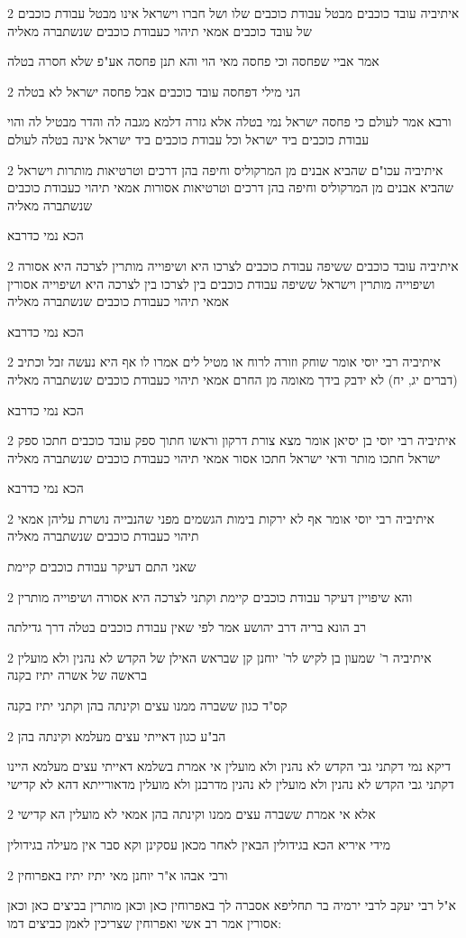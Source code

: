 \documentclass[12pt, openany]{book}
\newcommand{\sethebfont}{
\fontsize{10.5pt}{21.0pt} \selectfont
}
\newcommand{\twocol}[1]{
	{\sethebfont \begin{multicols}{2}
			#1
	\end{multicols}}	
}
\begin{document}
\twocol{איתיביה עובד כוכבים מבטל עבודת כוכבים שלו ושל חברו וישראל אינו מבטל עבודת כוכבים של עובד כוכבים אמאי תיהוי כעבודת כוכבים שנשתברה מאליה
\par אמר אביי שפחסה וכי פחסה מאי הוי והא תנן פחסה אע"פ שלא חסרה בטלה}
\twocol{הני מילי דפחסה עובד כוכבים אבל פחסה ישראל לא בטלה
\par ורבא אמר לעולם כי פחסה ישראל נמי בטלה אלא גזרה דלמא מגבה לה והדר מבטיל לה והוי עבודת כוכבים ביד ישראל וכל עבודת כוכבים ביד ישראל אינה בטלה לעולם}
\twocol{איתיביה עכו"ם שהביא אבנים מן המרקוליס וחיפה בהן דרכים וטרטיאות מותרות וישראל שהביא אבנים מן המרקוליס וחיפה בהן דרכים וטרטיאות אסורות אמאי תיהוי כעבודת כוכבים שנשתברה מאליה
\par הכא נמי כדרבא}
\twocol{איתיביה עובד כוכבים ששיפה עבודת כוכבים לצרכו היא ושיפוייה מותרין לצרכה היא אסורה ושיפוייה מותרין וישראל ששיפה עבודת כוכבים בין לצרכו בין לצרכה היא ושיפוייה אסורין אמאי תיהוי כעבודת כוכבים שנשתברה מאליה
\par הכא נמי כדרבא}
\twocol{איתיביה רבי יוסי אומר שוחק וזורה לרוח או מטיל לים אמרו לו אף היא נעשה זבל וכתיב (דברים יג, יח) לא ידבק בידך מאומה מן החרם אמאי תיהוי כעבודת כוכבים שנשתברה מאליה
\par הכא נמי כדרבא}
\twocol{איתיביה רבי יוסי בן יסיאן אומר מצא צורת דרקון וראשו חתוך ספק עובד כוכבים חתכו ספק ישראל חתכו מותר ודאי ישראל חתכו אסור אמאי תיהוי כעבודת כוכבים שנשתברה מאליה
\par הכא נמי כדרבא}
\twocol{איתיביה רבי יוסי אומר אף לא ירקות בימות הגשמים מפני שהנבייה נושרת עליהן אמאי תיהוי כעבודת כוכבים שנשתברה מאליה
\par שאני התם דעיקר עבודת כוכבים קיימת}
\twocol{והא שיפויין דעיקר עבודת כוכבים קיימת וקתני לצרכה היא אסורה ושיפוייה מותרין
\par רב הונא בריה דרב יהושע אמר לפי שאין עבודת כוכבים בטלה דרך גדילתה}
\twocol{איתיביה ר' שמעון בן לקיש לר' יוחנן קן שבראש האילן של הקדש לא נהנין ולא מועלין בראשה של אשרה יתיז בקנה
\par קס"ד כגון ששברה ממנו עצים וקינתה בהן וקתני יתיז בקנה}
\twocol{הב"ע כגון דאייתי עצים מעלמא וקינתה בהן
\par דיקא נמי דקתני גבי הקדש לא נהנין ולא מועלין אי אמרת בשלמא דאייתי עצים מעלמא היינו דקתני גבי הקדש לא נהנין ולא מועלין לא נהנין מדרבנן ולא מועלין מדאורייתא דהא לא קדישי}
\twocol{אלא אי אמרת ששברה עצים ממנו וקינתה בהן אמאי לא מועלין הא קדישי
\par מידי איריא הכא בגידולין הבאין לאחר מכאן עסקינן וקא סבר אין מעילה בגידולין}
\twocol{ורבי אבהו א"ר יוחנן מאי יתיז יתיז באפרוחין
\par א"ל רבי יעקב לרבי ירמיה בר תחליפא אסברה לך באפרוחין כאן וכאן מותרין בביצים כאן וכאן אסורין אמר רב אשי ואפרוחין שצריכין לאמן כביצים דמו:}
\end{document}
